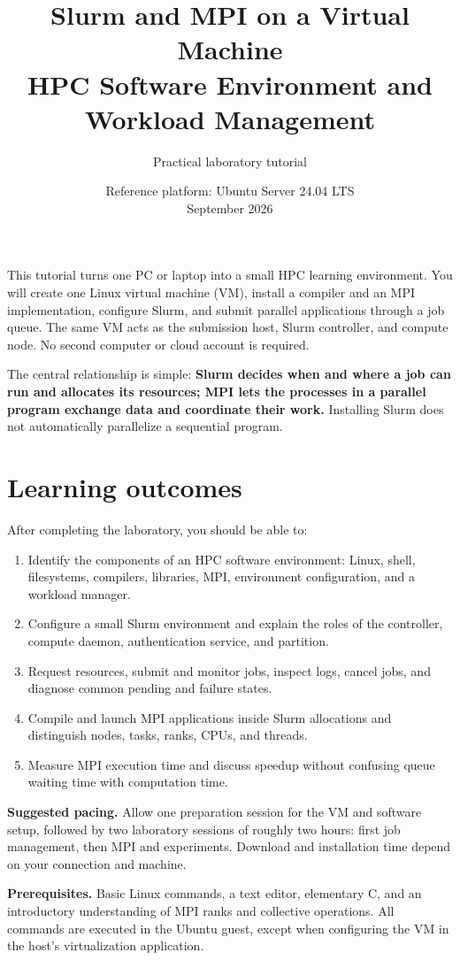 \documentclass[11pt,a4paper]{article}
\title{\textbf{Slurm and MPI on a Virtual Machine}\\[5pt]
  \large HPC Software Environment and Workload Management}
\author{Practical laboratory tutorial}
\date{Reference platform: Ubuntu Server 24.04 LTS\\September 2026}
\begin{document}
\maketitle

This tutorial turns one PC or laptop into a small HPC learning environment.
You will create one Linux virtual machine (VM), install a compiler and an MPI
implementation, configure Slurm, and submit parallel applications through a
job queue. The same VM acts as the submission host, Slurm controller, and
compute node. No second computer or cloud account is required.

The central relationship is simple: \textbf{Slurm decides when and where a job
can run and allocates its resources; MPI lets the processes in a parallel
program exchange data and coordinate their work.} Installing Slurm does not
automatically parallelize a sequential program.

\section*{Learning outcomes}
After completing the laboratory, you should be able to:
\begin{enumerate}
\item Identify the components of an HPC software environment: Linux, shell,
      filesystems, compilers, libraries, MPI, environment configuration, and
      a workload manager.
\item Configure a small Slurm environment and explain the roles of the
      controller, compute daemon, authentication service, and partition.
\item Request resources, submit and monitor jobs, inspect logs, cancel jobs,
      and diagnose common pending and failure states.
\item Compile and launch MPI applications inside Slurm allocations and
      distinguish nodes, tasks, ranks, CPUs, and threads.
\item Measure MPI execution time and discuss speedup without confusing
      queue waiting time with computation time.
\end{enumerate}

\textbf{Suggested pacing.} Allow one preparation session for the VM and
software setup, followed by two laboratory sessions of roughly two hours:
first job management, then MPI and experiments. Download and installation
time depend on your connection and machine.

\textbf{Prerequisites.} Basic Linux commands, a text editor, elementary C,
and an introductory understanding of MPI ranks and collective operations.
All commands are executed in the Ubuntu guest, except when configuring the
VM in the host's virtualization application.
\end{document}
